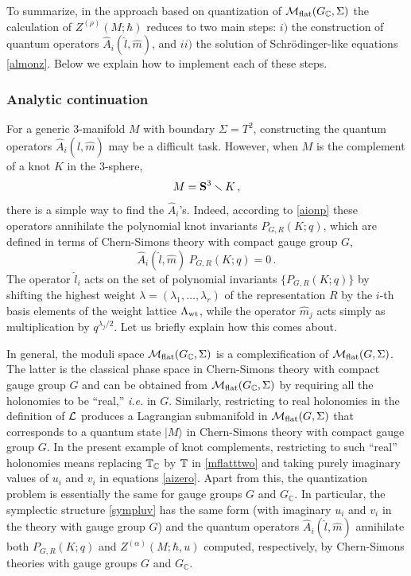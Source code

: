 \documentclass[hyper]{JHEP3}
\def\CL {{\cal L}}
\def\TT{{\Bbb{T}}}
\newcommand{\C}{{\mathbb{C}}}
\newcommand{\M}{{{\cal M}}_{{\rm flat}}}
\newcommand\be{\begin{equation}}
\newcommand\ee{\end{equation}}
\def\sm{\smallsetminus}
\begin{document}
To summarize, in the approach based on quantization of $\M (G_{\C}, \Sigma)$
the calculation of $Z^{(\rho)} (M;\hbar)$ reduces to two main steps:
$i)$ the construction of quantum operators $\widehat{A}_i (\hat l, \hat m )$,
and $ii)$ the solution of Schr\"odinger-like equations \eqref{almonz}.
Below we explain how to implement each of these steps.


\subsubsection{Analytic continuation}
\label{sec:analytic}

For a generic 3-manifold $M$ with boundary $\Sigma = T^2$,
constructing the quantum operators $\widehat{A}_i (\hat l, \hat m )$
may be a difficult task.
However, when $M$ is the complement of a knot $K$ in the 3-sphere,
  \be \label{mkcomplement}  M = {\bf S}^3 \sm K\,,   \ee
there is a simple way to find the $\widehat{A}_i$'s. Indeed, according to \eqref{aionp}
these operators annihilate the polynomial knot invariants $P_{G,R} (K;q)$, which are
defined in terms of Chern-Simons theory with compact gauge group $G$,
\be
\widehat{A}_i (\hat l, \hat m ) ~P_{G,R} (K;q) = 0\,.
\label{almionp}
\ee
The operator $\hat l_i$ acts on the set of polynomial invariants $\{ P_{G,R} (K;q) \}$
by shifting the highest weight $\lambda = (\lambda_1, \ldots, \lambda_r)$
of the representation $R$ by the $i$-th basis elements of the weight lattice $\Lambda_{{\rm wt}}$,
while the operator $\hat m_j$ acts simply as multiplication by $q^{\lambda_j / 2}$.
Let us briefly explain how this comes about.


In general, the moduli space $\M (G_{\C}, \Sigma)$ is a complexification of $\M (G,\Sigma)$.
The latter is the classical phase space in Chern-Simons theory with compact gauge group $G$
and can be obtained from $\M (G_{\C}, \Sigma)$ by requiring all the holonomies to be ``real,''
{\it i.e.} in $G$.
Similarly, restricting to real holonomies in the definition of $\CL$
produces a Lagrangian submanifold in $\M (G,\Sigma)$ that corresponds to
a quantum state $\vert M \rangle$ in Chern-Simons theory with compact gauge group $G$.
In the present example of knot complements,
restricting to such ``real'' holonomies means replacing $\TT_{\C}$ by $\TT$ in \eqref{mflatttwo}
and taking purely imaginary values of $u_i$ and $v_i$ in equations \eqref{aizero}.
Apart from this,
the quantization problem is essentially the same for gauge groups $G$ and $G_{\C}$.
In particular, the symplectic structure \eqref{sympluv} has the same form
(with imaginary $u_i$ and $v_i$ in the theory with gauge group $G$)
and the quantum operators $\widehat{A}_i (\hat l, \hat m )$
annihilate both $P_{G,R} (K;q)$ and $Z^{(\alpha)} (M;\hbar,u)$
computed, respectively, by Chern-Simons theories with gauge groups $G$ and $G_{\C}$.
\end{document}
